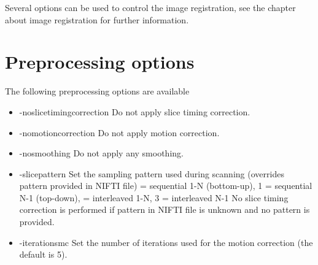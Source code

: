 Several options can be used to control the image registration, see the chapter about image registration for further information.

\section{Preprocessing options}

The following preprocessing options are available

\begin{itemize}

\item -noslicetimingcorrection
\newline \newline Do not apply slice timing correction. \newline

\item -nomotioncorrection
\newline \newline Do not apply motion correction. \newline

\item -nosmoothing
\newline \newline Do not apply any smoothing. \newline

\item -slicepattern
\newline \newline Set the sampling pattern used during scanning \newline
 				  (overrides pattern provided in NIFTI file)  = sequential 1-N (bottom-up), 1 = sequential N-1 (top-down),  = interleaved 1-N, 3 = interleaved N-1 \newline \newline
                  No slice timing correction is performed if pattern in \newline
                  NIFTI file is unknown and no pattern is provided. 

\item -iterationsmc 
\newline \newline Set the number of iterations used for the \newline motion correction (the default is 5).


\end{itemize}
